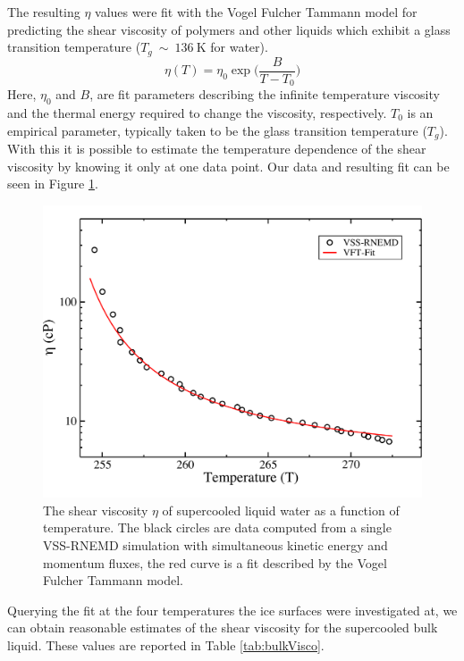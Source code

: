 The resulting $\eta$ values were fit with the Vogel Fulcher Tammann model
for predicting the shear viscosity of polymers and other liquids which
exhibit a glass transition temperature ($T_g~\sim~136~\mathrm{K}$ for
water). 
\begin{equation}\label{eq:WLF}
\eta (T) = \eta_0 \exp \Bigg({\frac{B}{T-T_0}}\Bigg)
\end{equation}
Here, $\eta_0$ and $B$, are fit parameters describing the infinite
temperature viscosity and the thermal energy required to change the
viscosity, respectively. $T_0$ is an empirical parameter, typically
taken to be the glass transition temperature ($T_g$).  With this it is
possible to estimate the temperature dependence of the shear viscosity
by knowing it only at one data point. Our data and resulting fit can
be seen in Figure \ref{fig:etaT}.
\begin{figure}
\includegraphics[width=\linewidth]{Figures/bulkVFT}
\caption{\label{fig:etaT} The shear viscosity $\eta$ of supercooled
  liquid water as a function of temperature. The black circles are
  data computed from a single VSS-RNEMD simulation with simultaneous
  kinetic energy and momentum fluxes, the red curve is a fit described
  by the Vogel Fulcher Tammann model.}
\end{figure} 
Querying the fit at the four temperatures the ice surfaces were
investigated at, we can obtain reasonable estimates of the shear
viscosity for the supercooled bulk liquid. These values are reported
in Table \ref{tab:bulkVisco}.
   


